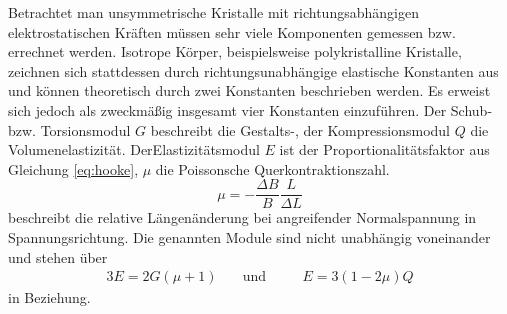 Betrachtet man unsymmetrische Kristalle mit richtungsabhängigen elektrostatischen Kräften müssen sehr viele Komponenten gemessen bzw. errechnet werden. 
Isotrope Körper, beispielsweise polykristalline Kristalle, zeichnen sich stattdessen durch richtungsunabhängige elastische Konstanten aus und können theoretisch durch zwei Konstanten beschrieben werden. 
Es erweist sich jedoch als zweckmäßig insgesamt vier Konstanten einzuführen.
Der Schub- bzw. Torsionsmodul $G$ beschreibt die Gestalts-, der Kompressionsmodul $Q$ die Volumenelastizität.
DerElastizitätsmodul $E$ ist der Proportionalitätsfaktor aus Gleichung \eqref{eq:hooke}, $\mu$ die Poissonsche Querkontraktionszahl. 
\begin{equation}
\mu=-\frac{\Delta{B}}{B}\frac{L}{\Delta{L}}
\label{eq:mu}
\end{equation}
beschreibt die relative Längenänderung bei angreifender Normalspannung in Spannungsrichtung.
Die genannten Module sind nicht unabhängig voneinander und stehen über
\begin{alignat}{3}
	 E=2G(\mu+1) &\quad\text{und} &&\quad E=3(1-2\mu)Q
\label{eq:modulbeziehungen}
\end{alignat}
in Beziehung.

